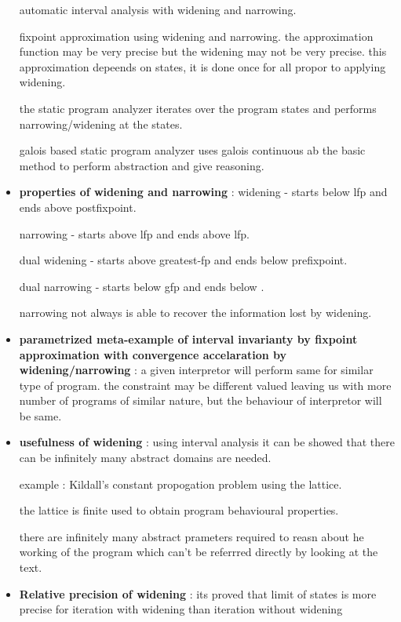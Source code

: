 \begin{itemize}
{	automatic interval analysis with widening and narrowing.

	fixpoint approximation using widening and narrowing. the approximation function may be very precise but the widening may not be very precise. this approximation depeends on states, it is done once for all propor to applying widening.

	the static program analyzer iterates over the program states and performs narrowing/widening at the states.

	galois based static program analyzer uses galois continuous ab the basic method to perform abstraction and give reasoning.
	}

	\item{\textbf{properties of widening and narrowing} : 
	widening - starts below lfp and ends above postfixpoint.

	narrowing - starts above lfp and ends above lfp.

	dual widening - starts above greatest-fp and ends below prefixpoint.

	dual narrowing - starts below gfp and ends below .

	narrowing not always is able to recover the information lost by widening.
	}

	\item{\textbf{parametrized meta-example of interval invarianty by fixpoint approximation with convergence accelaration by widening/narrowing} : a given interpretor will perform same for similar type of program. the constraint may be different valued leaving us with more number of programs of similar nature, but the behaviour of interpretor will be same.
	}

	\item{\textbf{usefulness of widening} : using interval analysis it can be showed that there can be infinitely many abstract domains are needed. 

	example : Kildall's constant propogation problem using the lattice.

	the lattice is finite used to obtain program behavioural properties.

	there are infinitely many abstract prameters required to reasn about he working of the program which can't be referrred directly by looking at the text.
	}

	\item{\textbf{Relative precision of widening} : its proved that limit of states is more precise for iteration with widening than iteration without widening
	}


\end{itemize}
